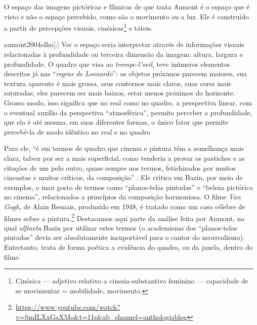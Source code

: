 O espaço das imagens pictóricas e fílmicas de que trata Aumont é o
espaço que é visto e não o espaço percebido, como são o movimento ou a
luz. Ele é construído a partir de percepções visuais,
cinésicas\footnote{Cinésica --- adjetivo relativo a cinesia-substantivo
	feminino --- capacidade de se movimentar = mobilidade, movimento.} e
táteis.

\begin{displaycquote}[113]{aumont2004olho}[.]
	Ver o espaço seria interpretar através de informações visuais
	relacionadas à profundidade ou terceira dimensão da imagem: altura,
	largura e profundidade. O quadro que visa ao \emph{trompe-l'oeil}, teve
	inúmeros elementos descritos já nas \enquote{\emph{regras de Leonardo}}: os
	objetos próximos parecem maiores, sua textura aparente é mais grossa,
	seus contornos mais claros, suas cores mais saturadas, eles parecem ser
	mais baixos, estar menos próximos do horizonte. Grosso modo, isso
	significa que no real como no quadro, a perspectiva linear, com o
	eventual auxílio da perspectiva \enquote{atmosférica}, permite perceber a
	profundidade, que ela é até mesmo, em suas diferentes formas, o único
	fator que permite percebê-la de modo idêntico no real e no quadro
\end{displaycquote}

Para ele, \enquote{é em termos de quadro que cinema e pintura têm a
	semelhança mais clara, talvez por ser a mais superficial, como tenderia
	a provar os pastiches e as citações de um pelo outro, quase sempre nos
	termos, fetichizados por muitos cineastas e muitos críticos, da
	composição} \parencite[123]{aumont2004olho}. Ele critica em Bazin, por meio de
exemplos, o mau gosto de termos como \enquote{planos-telas pintadas} e
\enquote{beleza pictórica no cinema}, relacionados a princípios da
composição harmoniosa. O filme \emph{Van Gogh}, de Alain Resnais,
produzido em 1948, é tratado como um caso célebre de filmes sobre a
pintura.\footnote{\url{https://www.youtube.com/watch?v=SmILXxGaXMo\&t=11s\&ab_channel=anthologiablog}}
Destacamos aqui parte da análise feita por Aumont, na qual
\emph{alfineta} Bazin por utilizar estes termos (o academismo dos
\enquote{planos-telas pintadas} devia ser absolutamente insuportável
para o cantor do neorrealismo). Entretanto, trata de forma poética a
evidência do quadro, ou da janela, dentro do filme.

